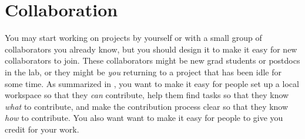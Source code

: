 \documentclass[10pt]{article}
\begin{document}
\section{Collaboration}\label{sec:collaboration}

You may start working on projects by yourself or with a small group of
collaborators you already know, but you should design it to make it easy
for new collaborators to join. These collaborators might be new
grad students or postdocs in the lab, or they might be \emph{you}
returning to a project that has been idle for some time. As summarized
in \cite{steinmacher2015}, you want to make it easy for people set up a
local workspace so that they \emph{can} contribute, help them find tasks
so that they know \emph{what} to contribute, and make the contribution
process clear so that they know \emph{how} to contribute.  You also want
want to make it easy for people to give you credit for your work.
\end{document}

